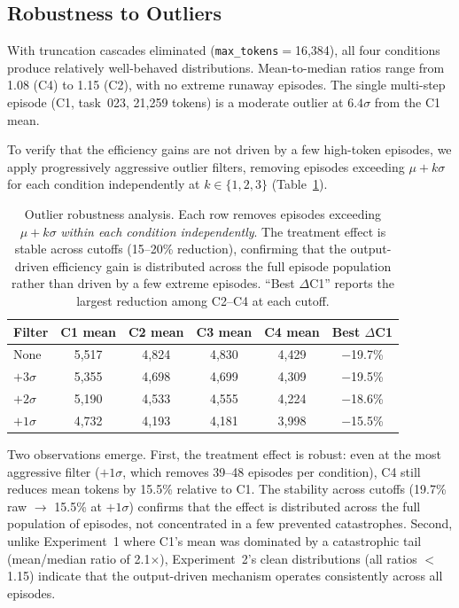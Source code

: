 
\subsection{Robustness to Outliers}
\label{sec:outlier_robustness}

With truncation cascades eliminated (\texttt{max\_tokens}$=$16{,}384), all four conditions produce relatively well-behaved distributions.
Mean-to-median ratios range from 1.08 (C4) to 1.15 (C2), with no extreme runaway episodes.
The single multi-step episode (C1, task~023, 21{,}259 tokens) is a moderate outlier at $6.4\sigma$ from the C1 mean.

To verify that the efficiency gains are not driven by a few high-token episodes, we apply progressively aggressive outlier filters, removing episodes exceeding $\mu + k\sigma$ for each condition independently at $k \in \{1, 2, 3\}$ (Table~\ref{tab:outlier_robustness}).

\begin{table}[t]
\centering
\small
\begin{tabular}{lccccc}
\toprule
\textbf{Filter} & \textbf{C1 mean} & \textbf{C2 mean} & \textbf{C3 mean} & \textbf{C4 mean} & \textbf{Best $\Delta$C1} \\
\midrule
None       & 5{,}517 & 4{,}824 & 4{,}830 & 4{,}429 & $-$19.7\% \\
$+3\sigma$ & 5{,}355 & 4{,}698 & 4{,}699 & 4{,}309 & $-$19.5\% \\
$+2\sigma$ & 5{,}190 & 4{,}533 & 4{,}555 & 4{,}224 & $-$18.6\% \\
$+1\sigma$ & 4{,}732 & 4{,}193 & 4{,}181 & 3{,}998 & $-$15.5\% \\
\bottomrule
\end{tabular}
\caption{Outlier robustness analysis. Each row removes episodes exceeding $\mu + k\sigma$ \emph{within each condition independently}. The treatment effect is stable across cutoffs (15--20\% reduction), confirming that the output-driven efficiency gain is distributed across the full episode population rather than driven by a few extreme episodes. ``Best $\Delta$C1'' reports the largest reduction among C2--C4 at each cutoff.}
\label{tab:outlier_robustness}
\end{table}

Two observations emerge.
First, the treatment effect is robust: even at the most aggressive filter ($+1\sigma$, which removes 39--48 episodes per condition), C4 still reduces mean tokens by 15.5\% relative to C1.
The stability across cutoffs (19.7\% raw $\rightarrow$ 15.5\% at $+1\sigma$) confirms that the effect is distributed across the full population of episodes, not concentrated in a few prevented catastrophes.
Second, unlike Experiment~1 where C1's mean was dominated by a catastrophic tail (mean/median ratio of 2.1$\times$), Experiment~2's clean distributions (all ratios $<$1.15) indicate that the output-driven mechanism operates consistently across all episodes.

